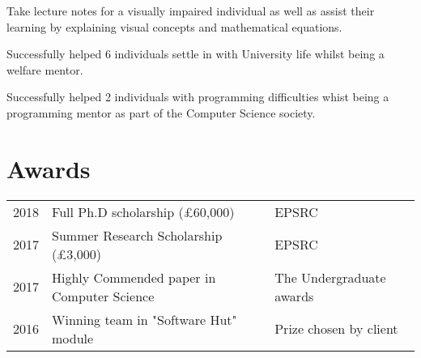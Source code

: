 \documentclass[]{deedy-resume-openfont}
\begin{document}
\begin{minipage}[t]{0.66\textwidth}
\begin{tightemize}
\item Take lecture notes for a visually impaired individual as well as assist their learning by explaining visual concepts and mathematical equations.
\end{tightemize}
\sectionsep

\begin{tightemize}
\item Successfully helped 6 individuals settle in with University life whilst being a welfare mentor.
\item Successfully helped 2 individuals with programming difficulties whist being a programming mentor as part of the Computer Science society.
\end{tightemize}
\sectionsep



\section{Awards} 
\begin{tabular}{rll}
2018	     & Full Ph.D scholarship (£60,000) & EPSRC\\
2017	     & Summer Research Scholarship (£3,000) & EPSRC\\
2017	     & Highly Commended paper in Computer Science & The Undergraduate awards\\
2016	     & Winning team in "Software Hut" module  & Prize chosen by client \\
\end{tabular}
\sectionsep


\end{minipage} 
\end{document}

